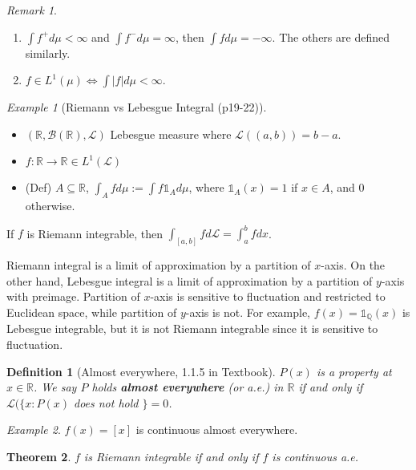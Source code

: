 \documentclass[12pt]{report}
\renewcommand{\1}{\mathbb{1}}
\renewcommand{\subset}{\subseteq}
\theoremstyle{break}
\newtheorem{thm}{Theorem}[section] %
\theoremstyle{newdef}
\newtheorem{defn}[thm]{Definition} %
\theoremstyle{remark}
\newtheorem*{exmp}{Example} %
\newtheorem*{rem}{Remark} %
\begin{document}
\begin{rem}
\leavevmode
\begin{enumerate}
\item $\int f^+ d\mu < \infty$ and $\int f^- d\mu = \infty$, then $\int fd\mu = -\infty$.
The others are defined similarly.
\item $f \in L^1(\mu) \Leftrightarrow \int |f|d\mu < \infty$.
\end{enumerate}
\end{rem}


\begin{exmp}[Riemann vs Lebesgue Integral (p19-22)]
\leavevmode
\begin{itemize}
\item $(\mathbb{R}, \mathcal{B}(\mathbb{R}), \mathcal{L})$ Lebesgue measure where $\mathcal{L}((a,b)) = b-a$.
\item $f : \mathbb{R} \rightarrow \mathbb{R} \in L^1(\mathcal{L})$
\item (Def) $A \subset \mathbb{R}$, $\int_A fd\mu := \int f \mathbb{1}_A d\mu$, where $\mathbb{1}_A(x) = 1$ if $x \in A$, and $0$ otherwise.
\end{itemize}
If $f$ is Riemann integrable, then $\int_{[a,b]} fd\mathcal{L} = \int_a^b fdx$.

Riemann integral is a limit of approximation by a partition of $x$-axis.
On the other hand, Lebesgue integral is a limit of approximation by a partition of $y$-axis with preimage.
Partition of $x$-axis is sensitive to fluctuation and restricted to Euclidean space, while partition of $y$-axis is not.
For example, $f(x) = \mathbb{1}_\mathbb{Q}(x)$ is Lebesgue integrable, but it is not Riemann integrable since it is sensitive to fluctuation.
\end{exmp}

\begin{defn}[Almost everywhere, 1.1.5 in Textbook]
$P(x)$ is a property at $x \in \mathbb{R}$.
We say $P$ holds \textbf{almost everywhere} (or a.e.) in $\mathbb{R}$ if and only if
$\mathcal{L}(\{x:P(x)$ does not hold $\} = 0$.
\end{defn}

\begin{exmp}
$f(x) = [x]$ is continuous almost everywhere.
\end{exmp}


\begin{thm}
$f$ is Riemann integrable if and only if $f$ is continuous a.e.
\end{thm}
\end{document}
